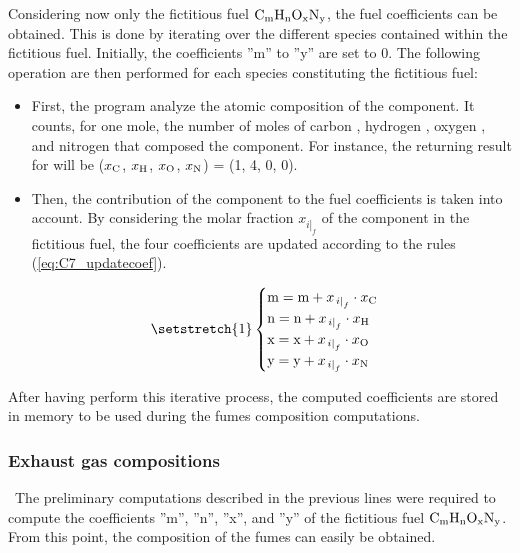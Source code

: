 Considering now only the fictitious fuel $\ce{C_{\text{m}}H_{\text{n}}O_{\text{x}}N_{\text{y}}}$, the fuel coefficients can be obtained. This is done by iterating over the different species contained within the fictitious fuel. Initially, the coefficients ''m'' to ''y'' are set to 0. The following operation are then performed for each species constituting the fictitious fuel:
\begin{itemize}
    \item First, the program analyze the atomic composition of the component. It counts, for one mole, the number of moles of carbon , hydrogen , oxygen , and nitrogen  that composed the component. For instance, the returning result for  will be ($x_{\ce{C}}$, $x_{\ce{H}}$, $x_{\ce{O}}$, $x_{\ce{N}}$) = (1, 4, 0, 0).
    \item Then, the contribution of the component to the fuel coefficients is taken into account. By considering the molar fraction $x_{\left.i\right|_f}$ of the component in the fictitious fuel, the four coefficients are updated according to the rules (\ref{eq:C7_updatecoef}).
    
    \begin{equation}
    \setstretch{1}
        \begin{cases}
        \text{m}=\text{m}+x_{\left.i\right|_f}\cdot x_{\ce{C}}\\
        \text{n}=\text{n}+x_{\left.i\right|_f}\cdot x_{\ce{H}}\\
        \text{x}=\text{x}+x_{\left.i\right|_f}\cdot x_{\ce{O}}\\
        \text{y}=\text{y}+x_{\left.i\right|_f}\cdot x_{\ce{N}}
        \end{cases}\label{eq:C7_updatecoef}
    \end{equation}
\end{itemize}

After having perform this iterative process, the computed coefficients are stored in memory to be used during the fumes composition computations.
\subsubsection{Exhaust gas compositions}
\quad\ The preliminary computations described in the previous lines were required to compute the coefficients ''m'', ''n'', ''x'', and ''y'' of the fictitious fuel $\ce{C_{\text{m}}H_{\text{n}}O_{\text{x}}N_{\text{y}}}$. From this point, the composition of the fumes can easily be obtained. 

